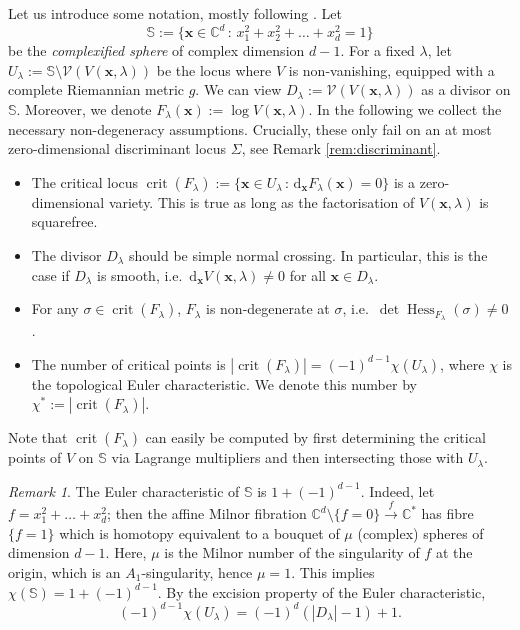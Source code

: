 \documentclass[11pt, a4paper]{article}
\numberwithin{theorem}{section}
\theoremstyle{remark}
\newtheorem{remark}[theorem]{Remark}
\newcommand{\CC}{\mathbb{C}}
\DeclareMathOperator{\crit}{crit}
\DeclareMathOperator{\Hess}{Hess}
\renewcommand{\d}{\mathrm{d}}
\newcommand{\V}{\mathcal{V}}
\newcommand{\bb}[1]{\boldsymbol{#1}}
\newcommand{\Sc}{\mathbb{S}}
\theoremstyle{theorem}
\begin{document}
Let us introduce some notation, mostly following \cite{matsubara2023localization}. Let 
\[ 
  \Sc := \{ \bb{x}\in \CC^d \,:\, x_1^2 + x_2^2 + \dots + x_d^2 = 1\}
\]
be the \emph{complexified sphere} of complex dimension $d-1$. For a fixed $\lambda$, let $U_\lambda := \Sc \setminus \V(V(\bb{x},\lambda))$ be the locus where $V$ is non-vanishing, equipped with a complete Riemannian metric $g$. We can view $D_\lambda := \V(V(\bb{x},\lambda))$ as a divisor on $\Sc$. Moreover, we denote $F_\lambda(\bb{x}) := \log V(\bb{x},\lambda)$. In the following we collect the necessary non-degeneracy assumptions. Crucially, these only fail on an at most zero-dimensional discriminant locus $\Sigma$, see Remark \ref{rem:discriminant}.
\begin{itemize}
  \label{itm:assumptions}
  \item[(A1)]  \label{ass:A1} The critical locus $\crit(F_\lambda) := \{\bb{x} \in U_\lambda \,:\, \d_{\bb{x}} F_\lambda(\bb{x}) = 0\}$ is a zero-dimensional variety. This is true as long as the factorisation of $V(\bb{x},\lambda)$ is squarefree.
  \item[(A2)]  \label{ass:A2} The divisor $D_\lambda$ should be simple normal crossing. In particular, this is the case if $D_\lambda$ is smooth, i.e.\ $\d_{\bb{x}} V(\bb{x},\lambda) \neq 0$ for all $\bb{x} \in D_\lambda$. 
 \item[(A3)]  \label{ass:A3} For any $\sigma\in \crit(F_\lambda)$, $F_\lambda$ is non-degenerate at $\sigma$, i.e.\ $\det \Hess_{F_\lambda}(\sigma) \neq 0$.
 \item[(A4)]  \label{ass:A4} The number of critical points is $|\crit(F_\lambda)| = (-1)^{d-1} \chi(U_\lambda)$, where $\chi$ is the topological Euler characteristic. We denote this number by $\chi^\ast := |\crit(F_\lambda)|$.
\end{itemize}

Note that $\crit(F_\lambda)$ can easily be computed by first determining the critical points of $V$ on $\Sc$ via Lagrange multipliers and then intersecting those with $U_\lambda$.

\begin{remark}
  The Euler characteristic of $\Sc$ is $1 + (-1)^{d-1}$. Indeed, let $f=x_1^2 + \dots + x_d^2$; then the affine Milnor fibration $\CC^d\setminus \{f = 0\} \xrightarrow{f} \CC^*$ has fibre $\{f=1\}$ which is homotopy equivalent to a bouquet of $\mu$ (complex) spheres of dimension $d-1$. Here, $\mu$ is the Milnor number of the singularity of $f$ at the origin, which is an $A_1$-singularity, hence $\mu=1$. This implies $\chi(\Sc) = 1 + (-1)^{d-1}$. By the excision property of the Euler characteristic,
  \begin{equation}
    \label{eq:Euler_char_U}
    (-1)^{d-1}\chi(U_\lambda) = (-1)^d \left( |D_\lambda| - 1 \right) + 1.
  \end{equation}
\end{remark}
\end{document}
